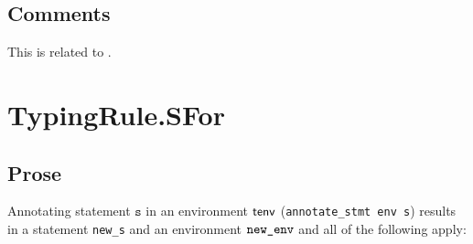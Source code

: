 \documentclass{book}
\newcommand\vs[0]{\texttt{s}}
\begin{document}
\subsection{Comments}
    This is related to .

\section{TypingRule.SFor \label{sec:TypingRule.SFor}}

  \subsection{Prose}
Annotating statement $\vs$ in an environment $\textsf{tenv}$
(\texttt{annotate\_stmt env s}) results in a statement \texttt{new\_s} and an
environment $\texttt{new\_env}$ and all of the following apply:
\end{document}
